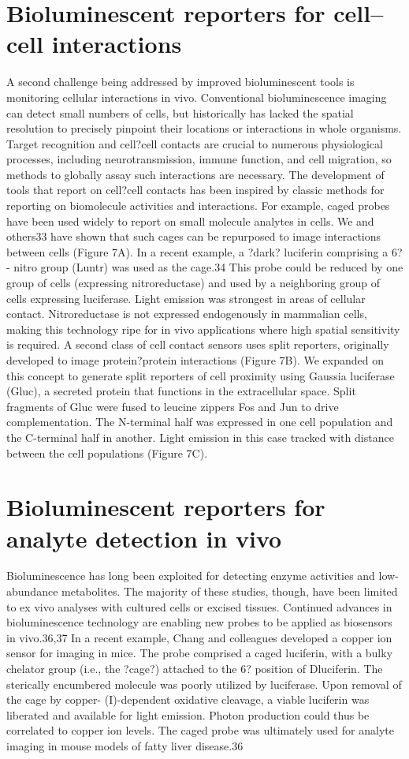 \section{Bioluminescent reporters for cell--cell interactions}
A second challenge being addressed by improved bioluminescent
tools is monitoring cellular interactions in vivo.
Conventional bioluminescence imaging can detect small
numbers of cells, but historically has lacked the spatial
resolution to precisely pinpoint their locations or interactions
in whole organisms. Target recognition and cell?cell contacts
are crucial to numerous physiological processes, including
neurotransmission, immune function, and cell migration, so
methods to globally assay such interactions are necessary.
The development of tools that report on cell?cell contacts
has been inspired by classic methods for reporting on
biomolecule activities and interactions. For example, caged
probes have been used widely to report on small molecule
analytes in cells. We and others33 have shown that such cages
can be repurposed to image interactions between cells (Figure
7A). In a recent example, a ?dark? luciferin comprising a 6?-
nitro group (Luntr) was used as the cage.34 This probe could
be reduced by one group of cells (expressing nitroreductase)
and used by a neighboring group of cells expressing luciferase.
Light emission was strongest in areas of cellular contact.
Nitroreductase is not expressed endogenously in mammalian
cells, making this technology ripe for in vivo applications where
high spatial sensitivity is required.
A second class of cell contact sensors uses split reporters,
originally developed to image protein?protein interactions
(Figure 7B). We expanded on this concept to generate split
reporters of cell proximity using Gaussia luciferase (Gluc), a
secreted protein that functions in the extracellular space. Split
fragments of Gluc were fused to leucine zippers Fos and Jun to
drive complementation. The N-terminal half was expressed in
one cell population and the C-terminal half in another. Light
emission in this case tracked with distance between the cell
populations (Figure 7C).
\section{Bioluminescent reporters for analyte detection in vivo}
Bioluminescence has long been exploited for detecting enzyme
activities and low-abundance metabolites. The majority of these
studies, though, have been limited to ex vivo analyses with
cultured cells or excised tissues. Continued advances in
bioluminescence technology are enabling new probes to be
applied as biosensors in vivo.36,37 In a recent example, Chang
and colleagues developed a copper ion sensor for imaging in
mice. The probe comprised a caged luciferin, with a bulky
chelator group (i.e., the ?cage?) attached to the 6? position of Dluciferin.
The sterically encumbered molecule was poorly
utilized by luciferase. Upon removal of the cage by copper-
(I)-dependent oxidative cleavage, a viable luciferin was liberated
and available for light emission. Photon production could thus
be correlated to copper ion levels. The caged probe was
ultimately used for analyte imaging in mouse models of fatty
liver disease.36
